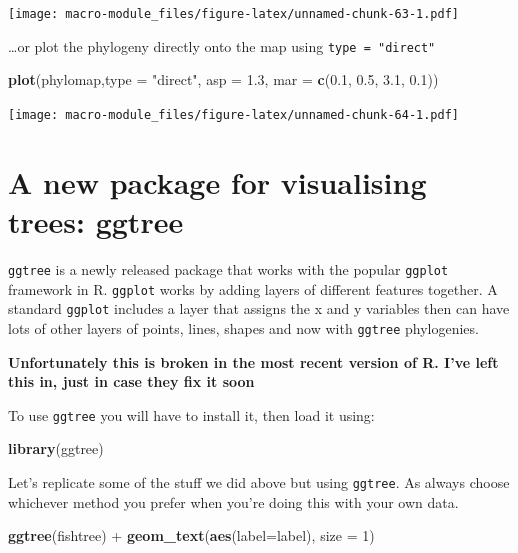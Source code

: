 \documentclass[]{book}
\newenvironment{Shaded}{\begin{snugshade}}{\end{snugshade}}
\newcommand{\KeywordTok}[1]{\textcolor[rgb]{0.13,0.29,0.53}{\textbf{{#1}}}}
\newcommand{\DataTypeTok}[1]{\textcolor[rgb]{0.13,0.29,0.53}{{#1}}}
\newcommand{\DecValTok}[1]{\textcolor[rgb]{0.00,0.00,0.81}{{#1}}}
\newcommand{\FloatTok}[1]{\textcolor[rgb]{0.00,0.00,0.81}{{#1}}}
\newcommand{\StringTok}[1]{\textcolor[rgb]{0.31,0.60,0.02}{{#1}}}
\newcommand{\NormalTok}[1]{{#1}}
\begin{document}
\texttt{[image: macro-module\_files/figure-latex/unnamed-chunk-63-1.pdf]}

\ldots{}or plot the phylogeny directly onto the map using
\texttt{type\ =\ "direct"}

\begin{Shaded}
\begin{Highlighting}[]
\KeywordTok{plot}\NormalTok{(phylomap,}\DataTypeTok{type =} \StringTok{"direct"}\NormalTok{, }\DataTypeTok{asp =} \FloatTok{1.3}\NormalTok{, }\DataTypeTok{mar =} \KeywordTok{c}\NormalTok{(}\FloatTok{0.1}\NormalTok{, }\FloatTok{0.5}\NormalTok{, }\FloatTok{3.1}\NormalTok{, }\FloatTok{0.1}\NormalTok{))}
\end{Highlighting}
\end{Shaded}

\texttt{[image: macro-module\_files/figure-latex/unnamed-chunk-64-1.pdf]}

\section{A new package for visualising trees:
ggtree}\label{a-new-package-for-visualising-trees-ggtree}

\texttt{ggtree} is a newly released package that works with the popular
\texttt{ggplot} framework in R. \texttt{ggplot} works by adding layers
of different features together. A standard \texttt{ggplot} includes a
layer that assigns the x and y variables then can have lots of other
layers of points, lines, shapes and now with \texttt{ggtree}
phylogenies.

\textbf{Unfortunately this is broken in the most recent version of R.
I've left this in, just in case they fix it soon}

To use \texttt{ggtree} you will have to install it, then load it using:

\begin{Shaded}
\begin{Highlighting}[]
\KeywordTok{library}\NormalTok{(ggtree)}
\end{Highlighting}
\end{Shaded}

Let's replicate some of the stuff we did above but using
\texttt{ggtree}. As always choose whichever method you prefer when
you're doing this with your own data.

\begin{Shaded}
\begin{Highlighting}[]
\KeywordTok{ggtree}\NormalTok{(fishtree) +}
\KeywordTok{geom_text}\NormalTok{(}\KeywordTok{aes}\NormalTok{(}\DataTypeTok{label=}\NormalTok{label), }\DataTypeTok{size =} \DecValTok{1}\NormalTok{)}
\end{Highlighting}
\end{Shaded}
\end{document}

